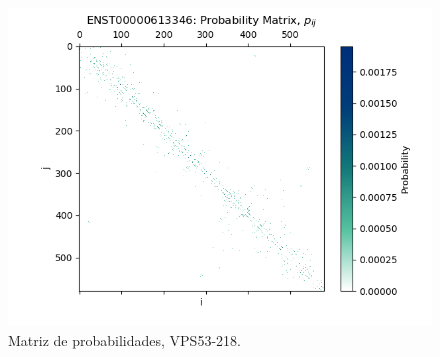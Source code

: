 \documentclass[a4paper,11pt,titlepage]{article}
\theoremstyle{definition}
\begin{document}
\begin{figure}[H]
    \hfill
    \begin{minipage}[c]{0.31\textwidth}
        \centering
        \includegraphics[width=\textwidth]{images/VPS53-218-db_iter-matrix.png}
        \caption{Matriz de probabilidades, VPS53-218.}
        \label{fig:VPS53-218-matrix}
    \end{minipage}
\end{figure}
\end{document}
